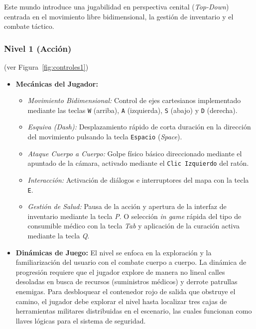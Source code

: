 Este mundo introduce una jugabilidad en perspectiva cenital (\textit{Top-Down}) centrada en el movimiento libre bidimensional, la gestión de inventario y el combate táctico.

\subsubsection{Nivel 1 (Acción)} (ver Figura~\ref{fig:controles1})
\begin{itemize}
    \item \textbf{Mecánicas del Jugador:}
    \begin{itemize}
        \item \textit{Movimiento Bidimensional:} Control de ejes cartesianos implementado mediante las teclas \texttt{W} (arriba), \texttt{A} (izquierda), \texttt{S} (abajo) y \texttt{D} (derecha).
        \item \textit{Esquiva (Dash):} Desplazamiento rápido de corta duración en la dirección del movimiento pulsando la tecla \texttt{Espacio} (\textit{Space}).
        \item \textit{Ataque Cuerpo a Cuerpo:} Golpe físico básico direccionado mediante el apuntado de la cámara, activado mediante el \texttt{Clic Izquierdo} del ratón.
        \item \textit{Interacción:} Activación de diálogos e interruptores del mapa con la tecla \texttt{E}.
        \item \textit{Gestión de Salud:} Pausa de la acción y apertura de la interfaz de inventario mediante la tecla \textit{P}. O selección \textit{in game} rápida del tipo de consumible médico con la tecla \textit{Tab} y aplicación de la curación activa mediante la tecla \textit{Q}.
    \end{itemize}
    
    \item \textbf{Dinámicas de Juego:}
    El nivel se enfoca en la exploración y la familiarización del usuario con el combate cuerpo a cuerpo. La dinámica de progresión requiere que el jugador explore de manera no lineal calles desoladas en busca de recursos (suministros médicos) y derrote patrullas enemigas. Para desbloquear el contenedor rojo de salida que obstruye el camino, el jugador debe explorar el nivel hasta localizar tres cajas de herramientas militares distribuidas en el escenario, las cuales funcionan como llaves lógicas para el sistema de seguridad.
\end{itemize}


